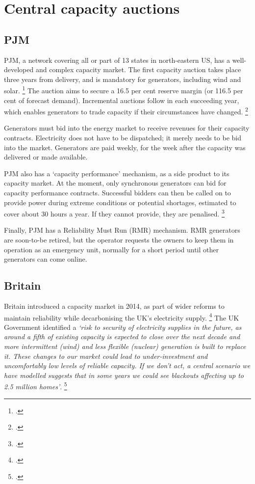 \documentclass[FrontPage]{grattan}
\begin{document}
\section{Central capacity auctions}\label{sec:appendix-central-capacity-auctions}

\subsection{PJM}\label{subsec:appendix-pjm}
PJM, a network covering all or part of 13 states in north-eastern US, has a well-developed and complex capacity market. The first capacity auction takes place three years from delivery, and is mandatory for generators, including wind and solar.%
\footcite{PJM2016AuctionFAQs}
The auction aims to secure a 16.5 per cent reserve margin (or 116.5 per cent of forecast demand). Incremental auctions follow in each succeeding year, which enables generators to trade capacity if their circumstances have changed.%
\footcite{bowring2013capacity}

Generators must bid into the energy market to receive revenues for their capacity contracts. Electricity does not have to be dispatched; it merely needs to be bid into the market. Generators are paid weekly, for the week after the capacity was delivered or made available.

PJM also has a `capacity performance' mechanism, as a side product to its capacity market. At the moment, only synchronous generators can bid for capacity performance contracts. Successful bidders can then be called on to provide power during extreme conditions or potential shortages, estimated to cover about 30 hours a year. If they cannot provide, they are penalised.%
\footcite{Kolo2016PJMCapacityPerformance}

Finally, PJM has a Reliability Must Run (RMR) mechanism. RMR generators are soon-to-be retired, but the operator requests the owners to keep them in operation as an emergency unit, normally for a short period until other generators can come online.

\subsection{Britain}\label{subsec:appendix-uk}
Britain introduced a capacity market in 2014, as part of wider reforms to maintain reliability while decarbonising the UK's electricity supply.%
\footcite{Orme2016UKCapacityMarket}
The UK Government identified a \emph{`risk to security of electricity supplies in the future, as around a fifth of existing capacity is expected to close over the next decade and more intermittent (wind) and less flexible (nuclear) generation is built to replace it. These changes to our market could lead to under-investment and uncomfortably low levels of reliable capacity. If we don't act, a central scenario we have modelled suggests that in some years we could see blackouts affecting up to 2.5 million homes'}.%
\footcite{DECC2012EMRCapacityDesign}
\end{document}
